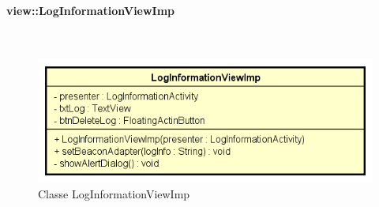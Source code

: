 \documentclass[../DefinizioneDiProdotto.tex]{subfiles}
\begin{document}
\paragraph{view::LogInformationViewImp}
\
\begin{figure}[H]
	\centering
	\includegraphics[width=\maxwidth]{img/LogInformationViewImp.png}
	\caption{Classe LogInformationViewImp}\label{fig:view::LogInformationViewImp} 
\end{figure}
\end{document}
